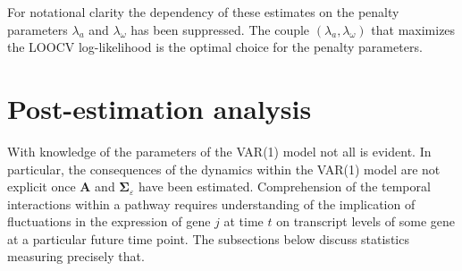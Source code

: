 For notational clarity the dependency of these estimates on the penalty parameters $\lambda_a$ and $\lambda_{\omega}$ has been suppressed. The couple $(\lambda_a, \lambda_{\omega})$ that maximizes the LOOCV log-likelihood is the optimal choice for the penalty parameters.



\section{Post-estimation analysis}
With knowledge of the parameters of the VAR(1) model not all is evident. In particular, the consequences of the dynamics within the VAR(1) model are not explicit once $\mathbf{A}$ and $\mathbf{\Sigma}_{\varepsilon}$ have been estimated. Comprehension of the temporal interactions within a pathway requires understanding of the implication of fluctuations in the expression of gene $j$ at time $t$ on transcript levels of some gene at a particular future time point. The subsections below discuss statistics measuring precisely that.


